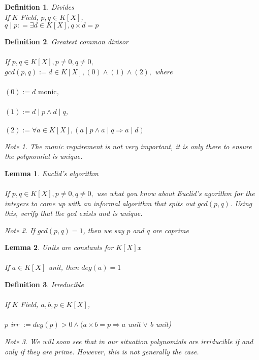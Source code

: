 \documentclass{article}
\theoremstyle{definitionstyle}
\newtheorem{defn}{Definition}[section]
\theoremstyle{lemmastyle}
\newtheorem{lem}{Lemma}[section]
\theoremstyle{remark}
\newtheorem*{note}{Note}
\begin{document}
\begin{defn} Divides\\
If $K$ Field, $p, q \in K[X]$,\\

$q \mid p : = \exists d \in K[X], q \times d = p$
\end{defn}

\begin{defn} Greatest common divisor\\
\\
If $p, q \in K[X], p \ne 0, q \ne 0,$\\

$gcd(p, q) := d \in K[X], (0) \land (1) \land (2),$ where\\
\\
$(0) := d \text{ monic}$,\\
\\
$(1) := d \mid p \land d \mid q$,\\
\\
$(2) := \forall a \in K[X], (a \mid p \land a \mid q \Rightarrow a \mid d)$
\begin{note} The monic requirement is not very important, it is only there to ensure the polynomial is unique. \end{note}

\end{defn}

\begin{lem} Euclid's algorithm\\
\\
If $p, q \in K[X], p \ne 0, q \ne 0,$ use what you know about Euclid's agorithm for the integers to come up with an informal algorithm that spits out $gcd(p,q)$. Using this, verify that the gcd exists and is unique.
\begin{note} If $gcd(p, q) = 1$, then we say $p$ and $q$ are coprime \end{note}
\end{lem}

\begin{lem} Units are constants for $K[X]$x\\
\\
If $a \in K[X]$ unit, then $deg(a) = 1$\end{lem}

\begin{defn} Irreducible\\
\\
If $K$ Field, $a, b, p \in K[X]$,\\
\\
$p$ irr $:= deg(p) > 0 \land (a \times b = p \Rightarrow a$ unit $\lor$ $b$ unit)
\begin{note} We will soon see that in our situation polynomials are irriducible if and only if they are prime. However, this is not generally the case. \end{note} \end{defn}
\end{document}

